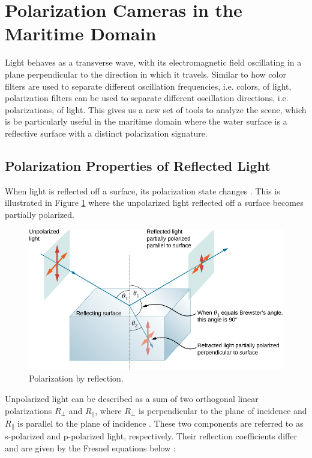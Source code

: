 \section{Polarization Cameras in the Maritime Domain}
Light behaves as a transverse wave, with its electromagnetic field oscillating in a plane perpendicular to the direction in which it travels.
Similar to how color filters are used to separate different oscillation frequencies, i.e. colors, of light, polarization filters can be used to separate different oscillation directions, i.e. polarizations, of light.
This gives us a new set of tools to analyze the scene, which is be particularly useful in the maritime domain where the water surface is a reflective surface with a distinct polarization signature.

\subsection{Polarization Properties of Reflected Light}
When light is reflected off a surface, its polarization state changes \cite[34]{lingUniversityPhysicsVolume2016}.
This is illustrated in Figure \ref{fig:polarized_reflection} where the unpolarized light reflected off a surface becomes partially polarized.

\begin{figure}[H]
    \centering
    \includegraphics[width=.8\linewidth]{figures/polarization/reflaction.png}
    \caption{Polarization by reflection.
        \cite[Figure 1.38]{lingUniversityPhysicsVolume2016}}
    \label{fig:polarized_reflection}
\end{figure}


Unpolarized light can be described as a sum of two orthogonal linear polarizations $R_\perp$ and $R_\parallel$, where $R_\perp$ is perpendicular to the plane of incidence and $R_\parallel$ is parallel to the plane of incidence  \cite{FresnelEquations2024}.
These two components are referred to as s-polarized and p-polarized light, respectively.
Their reflection coefficients differ and are given by the Fresnel equations below \cite{FresnelEquations2024}:

